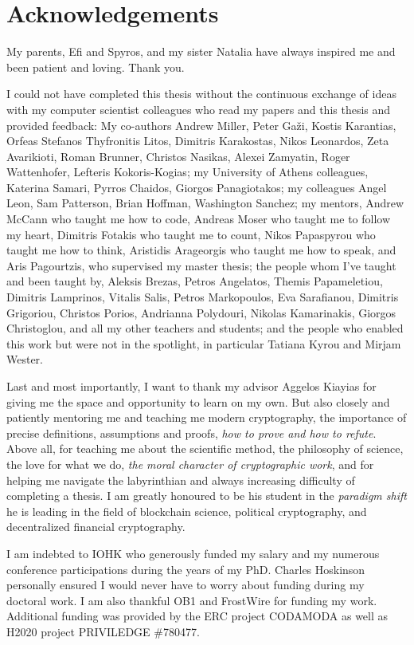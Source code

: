 \section*{Acknowledgements}

My parents, Efi and Spyros, and my sister Natalia have always inspired me and
been patient and loving. Thank you.

I could not have completed this thesis without the continuous exchange of ideas
with my computer scientist colleagues who read my papers and this thesis and
provided feedback: My co-authors Andrew Miller, Peter Ga\v{z}i, Kostis
Karantias, Orfeas Stefanos Thyfronitis Litos, Dimitris Karakostas, Nikos
Leonardos, Zeta Avarikioti, Roman Brunner, Christos Nasikas,  Alexei Zamyatin,
Roger Wattenhofer, Lefteris Kokoris-Kogias; my University of Athens colleagues,
Katerina Samari, Pyrros Chaidos, Giorgos Panagiotakos; my colleagues Angel Leon,
Sam Patterson, Brian Hoffman, Washington Sanchez; my mentors, Andrew McCann who
taught me how to code, Andreas Moser who taught me to follow my heart, Dimitris
Fotakis who taught me to count, Nikos Papaspyrou who taught me how to think,
Aristidis Arageorgis who taught me how to speak, and Aris Pagourtzis, who
supervised my master thesis; the people whom I've taught and been taught by,
Aleksis Brezas, Petros Angelatos, Themis Papameletiou, Dimitris Lamprinos,
Vitalis Salis, Petros Markopoulos, Eva Sarafianou, Dimitris Grigoriou, Christos
Porios, Andrianna Polydouri, Nikolas Kamarinakis, Giorgos Christoglou, and all
my other teachers and students; and the people who enabled this work but were
not in the spotlight, in particular Tatiana Kyrou and Mirjam Wester.

Last and most importantly, I want to thank my advisor Aggelos Kiayias for
giving me the space and opportunity to learn on my own. But also closely and
patiently mentoring me and teaching me modern cryptography, the importance of
precise definitions, assumptions and proofs, \emph{how to prove and how to
refute}. Above all, for teaching me about the scientific method, the philosophy
of science, the love for what we do, \emph{the moral character of
cryptographic work}, and for helping me navigate the labyrinthian and
always increasing difficulty of completing a thesis. I am greatly
honoured to be his student in the \emph{paradigm shift} he is leading in the
field of blockchain science, political cryptography, and decentralized financial
cryptography.

I am indebted to IOHK who generously funded my salary and my numerous conference
participations during the years of my PhD. Charles Hoskinson personally ensured
I would never have to worry about funding during my doctoral work. I am also
thankful OB1 and FrostWire for funding my work. Additional funding was provided
by the ERC project CODAMODA as well as H2020 project PRIVILEDGE \#780477.
